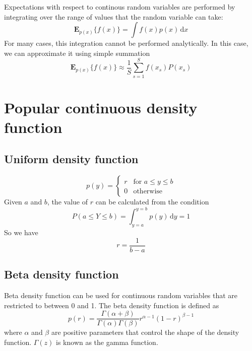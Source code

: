 Expectations with respect to continous random variables are performed by integrating
over the range of values that the random variable can take:
\begin{equation}
\mathbf{E}_{p(x)}\{f(x)\} = \int f(x) p(x)\,\mathrm{d}x
\end{equation}
For many cases, this integration cannot be performed analytically. In this case, we can
approximate it using simple summation
\begin{equation}
\mathbf{E}_{p(x)}\{f(x)\} \approx \frac{1}{S}\sum_{s=1}^{S} f(x_s) P(x_s)
\end{equation}


\section{Popular continuous density function}

\subsection{Uniform density function}
\begin{equation}
p(y) = \begin{cases}
r & \text{for } a \leq y \leq b \\
0 & \text{otherwise}
\end{cases}
\end{equation}
Given $a$ and $b$, the value of $r$ can be calculated from the condition
\begin{equation*}
P(a \leq Y \leq b) = \int_{y=a}^{y=b} p(y)\,\mathrm{d}y = 1
\end{equation*}
So we have
\begin{equation*}
r = \frac{1}{b - a}
\end{equation*}


\subsection{Beta density function}

Beta density function can be used for continuous random variables that are restricted to
between 0 and 1. The beta density function is defined as
\begin{equation}
p(r) = \frac{\Gamma(\alpha + \beta)}{\Gamma(\alpha)\Gamma(\beta)}
r^{\alpha-1} (1 - r)^{\beta - 1}
\end{equation}
where $\alpha$ and $\beta$ are positive parameters that control the shape of the density function.
$\Gamma(z)$ is known as the gamma function.


